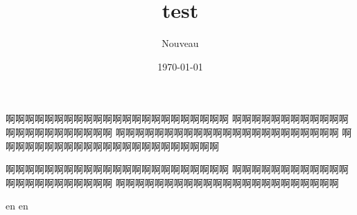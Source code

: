 \documentclass{article}  %
\title{test}
\author{Nouveau}
\date{\today}
\begin{document}
\maketitle

\xiaosi \selectfont
啊啊啊啊啊啊啊啊啊啊啊啊啊啊啊啊啊啊啊啊啊啊啊
啊啊啊啊啊啊啊啊啊啊啊啊啊啊啊啊啊啊啊啊啊啊啊
啊啊啊啊啊啊啊啊啊啊啊啊啊啊啊啊啊啊啊啊啊啊啊
啊啊啊啊啊啊啊啊啊啊啊啊啊啊啊啊啊啊啊啊啊啊啊

啊啊啊啊啊啊啊啊啊啊啊啊啊啊啊啊啊啊啊啊啊啊啊
啊啊啊啊啊啊啊啊啊啊啊啊啊啊啊啊啊啊啊啊啊啊啊
啊啊啊啊啊啊啊啊啊啊啊啊啊啊啊啊啊啊啊啊啊啊啊

en
en
\end{document}
